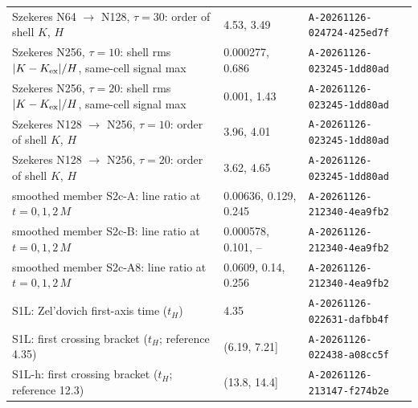 \begin{table}
\begin{ruledtabular}
\begin{tabular}{lll}
Szekeres N64 $\to$ N128, $\tau = 30$: order of shell $K$, $H$ & 4.53, 3.49 & \texttt{A-20261126-024724-425ed7f} \\
Szekeres N256, $\tau = 10$: shell rms $|K-K_{\rm ex}|/H$, same-cell signal max & 0.000277, 0.686 & \texttt{A-20261126-023245-1dd80ad} \\
Szekeres N256, $\tau = 20$: shell rms $|K-K_{\rm ex}|/H$, same-cell signal max & 0.001, 1.43 & \texttt{A-20261126-023245-1dd80ad} \\
Szekeres N128 $\to$ N256, $\tau = 10$: order of shell $K$, $H$ & 3.96, 4.01 & \texttt{A-20261126-023245-1dd80ad} \\
Szekeres N128 $\to$ N256, $\tau = 20$: order of shell $K$, $H$ & 3.62, 4.65 & \texttt{A-20261126-023245-1dd80ad} \\
smoothed member S2c-A: line ratio at $t = 0, 1, 2\,M$ & 0.00636, 0.129, 0.245 & \texttt{A-20261126-212340-4ea9fb2} \\
smoothed member S2c-B: line ratio at $t = 0, 1, 2\,M$ & 0.000578, 0.101, -- & \texttt{A-20261126-212340-4ea9fb2} \\
smoothed member S2c-A8: line ratio at $t = 0, 1, 2\,M$ & 0.0609, 0.14, 0.256 & \texttt{A-20261126-212340-4ea9fb2} \\
S1L: Zel'dovich first-axis time ($t_H$) & 4.35 & \texttt{A-20261126-022631-dafbb4f} \\
S1L: first crossing bracket ($t_H$; reference 4.35) & (6.19, 7.21] & \texttt{A-20261126-022438-a08cc5f} \\
S1L-h: first crossing bracket ($t_H$; reference 12.3) & (13.8, 14.4] & \texttt{A-20261126-213147-f274b2e} \\
\end{tabular}
\end{ruledtabular}
\end{table}
